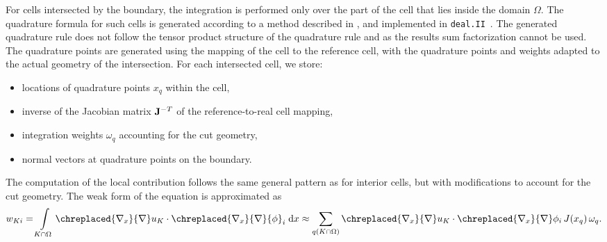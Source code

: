 \documentclass[11pt,a4paper]{article}
\begin{document}
For cells intersected by the boundary, the integration is performed only over the part of the cell that lies inside the
domain $\Omega$. The quadrature formula for such cells is generated according to a method described in
\cite{saye2015high}, and implemented in \texttt{deal.II}~\cite{dealii2019design}. The generated quadrature rule does
not follow the tensor product structure of the quadrature rule and as the results sum factorization cannot be used. The
quadrature points are generated using the mapping of the cell to the reference cell, with the quadrature points and
weights adapted to the actual geometry of the intersection. For each intersected cell, we store:
\begin{itemize}
    \item locations of quadrature points $x_q$ within the cell, \item{ inverse of the Jacobian matrix ${\rm\bf J}^{-T}$ of the
          reference-to-real cell mapping,}
    \item integration weights $\omega_q$ accounting for the cut geometry,
    \item normal vectors at quadrature points on the boundary.
\end{itemize}

The computation of the local contribution follows the same general pattern as for interior cells, but with
modifications to account for the cut geometry. The weak form of the equation is approximated as
\begin{equation}
    w_{Ki}=\int\limits_{K \cap \Omega}	\chreplaced{\nabla_x}{\nabla} u_K   \cdot \chreplaced{\nabla_x}{\nabla} {\phi }_i \;	\Dd x
    \approx \sum_{q(K \cap \Omega)}	\chreplaced{\nabla_x}{\nabla} u_K   \cdot  \chreplaced{\nabla_x}{\nabla}\phi_i \, J(x_q) \, \omega_q.
\end{equation}
\end{document}

